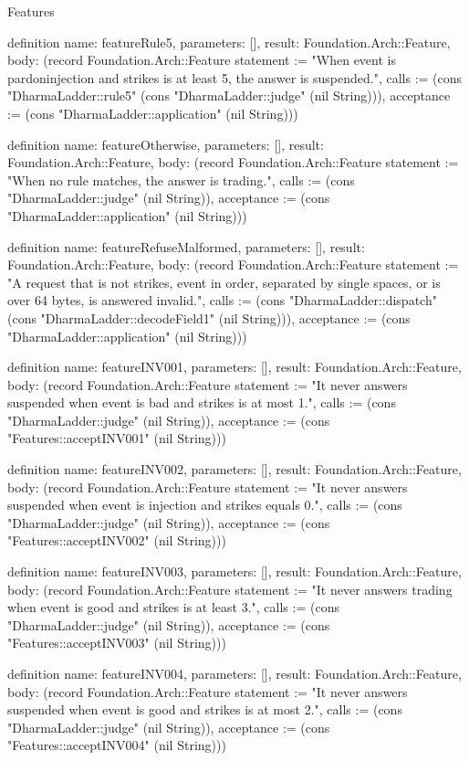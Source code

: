 \begin{lexlean}{Features}
\begin{semanticmodule}
definition{
  name: featureRule5,
  parameters: [],
  result: Foundation.Arch::Feature,
  body: (record Foundation.Arch::Feature {statement := "When event is pardoninjection and strikes is at least 5, the answer is suspended.", calls := (cons "DharmaLadder::rule5" (cons "DharmaLadder::judge" (nil String))), acceptance := (cons "DharmaLadder::application" (nil String))})
}

definition{
  name: featureOtherwise,
  parameters: [],
  result: Foundation.Arch::Feature,
  body: (record Foundation.Arch::Feature {statement := "When no rule matches, the answer is trading.", calls := (cons "DharmaLadder::judge" (nil String)), acceptance := (cons "DharmaLadder::application" (nil String))})
}

definition{
  name: featureRefuseMalformed,
  parameters: [],
  result: Foundation.Arch::Feature,
  body: (record Foundation.Arch::Feature {statement := "A request that is not strikes, event in order, separated by single spaces, or is over 64 bytes, is answered invalid.", calls := (cons "DharmaLadder::dispatch" (cons "DharmaLadder::decodeField1" (nil String))), acceptance := (cons "DharmaLadder::application" (nil String))})
}

definition{
  name: featureINV001,
  parameters: [],
  result: Foundation.Arch::Feature,
  body: (record Foundation.Arch::Feature {statement := "It never answers suspended when event is bad and strikes is at most 1.", calls := (cons "DharmaLadder::judge" (nil String)), acceptance := (cons "Features::acceptINV001" (nil String))})
}

definition{
  name: featureINV002,
  parameters: [],
  result: Foundation.Arch::Feature,
  body: (record Foundation.Arch::Feature {statement := "It never answers suspended when event is injection and strikes equals 0.", calls := (cons "DharmaLadder::judge" (nil String)), acceptance := (cons "Features::acceptINV002" (nil String))})
}

definition{
  name: featureINV003,
  parameters: [],
  result: Foundation.Arch::Feature,
  body: (record Foundation.Arch::Feature {statement := "It never answers trading when event is good and strikes is at least 3.", calls := (cons "DharmaLadder::judge" (nil String)), acceptance := (cons "Features::acceptINV003" (nil String))})
}

definition{
  name: featureINV004,
  parameters: [],
  result: Foundation.Arch::Feature,
  body: (record Foundation.Arch::Feature {statement := "It never answers suspended when event is good and strikes is at most 2.", calls := (cons "DharmaLadder::judge" (nil String)), acceptance := (cons "Features::acceptINV004" (nil String))})
}


\end{semanticmodule}
\end{lexlean}
